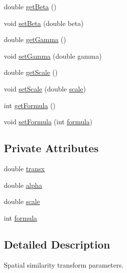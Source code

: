 \begin{DoxyCompactItemize}
double \hyperlink{classparams_1_1_spatial_similarity_transform_parm_ae9e8e3926d4f2909d772f3bd6018ea99}{get\+Beta} ()
\item 
void \hyperlink{classparams_1_1_spatial_similarity_transform_parm_a2a5a2416faca1d1afa482d65737f9b21}{set\+Beta} (double beta)
\item 
double \hyperlink{classparams_1_1_spatial_similarity_transform_parm_aab854337ef47999b9bdd44f7a319fd77}{get\+Gamma} ()
\item 
void \hyperlink{classparams_1_1_spatial_similarity_transform_parm_aaab95d6e73a61147ff22c52971cdf728}{set\+Gamma} (double gamma)
\item 
double \hyperlink{classparams_1_1_spatial_similarity_transform_parm_a570ac3a9dd6a2448e4eeffac47cdca6d}{get\+Scale} ()
\item 
void \hyperlink{classparams_1_1_spatial_similarity_transform_parm_a73755392f0f98c4cdd20de9770935f22}{set\+Scale} (double \hyperlink{classparams_1_1_spatial_similarity_transform_parm_af481ab8897e883489a144acfb6257220}{scale})
\item 
int \hyperlink{classparams_1_1_spatial_similarity_transform_parm_ad59a530af9a3860239c9cfc5ea37b738}{get\+Formula} ()
\item 
void \hyperlink{classparams_1_1_spatial_similarity_transform_parm_a527f9a94419840c4a7bb60db5bf99acb}{set\+Formula} (int \hyperlink{classparams_1_1_spatial_similarity_transform_parm_a79c758206551aee1178f8bdab3ecb488}{formula})
\end{DoxyCompactItemize}
\subsection*{Private Attributes}
\begin{DoxyCompactItemize}
\item 
double \hyperlink{classparams_1_1_spatial_similarity_transform_parm_aca67c037fdd9703e00d1b2a01e4c34b7}{transx}
\item 
double \hyperlink{classparams_1_1_spatial_similarity_transform_parm_a4f23eb3e8b5fc1b10958fd60b6484a77}{alpha}
\item 
double \hyperlink{classparams_1_1_spatial_similarity_transform_parm_af481ab8897e883489a144acfb6257220}{scale}
\item 
int \hyperlink{classparams_1_1_spatial_similarity_transform_parm_a79c758206551aee1178f8bdab3ecb488}{formula}
\end{DoxyCompactItemize}


\subsection{Detailed Description}
Spatial similarity transform parameters. 

